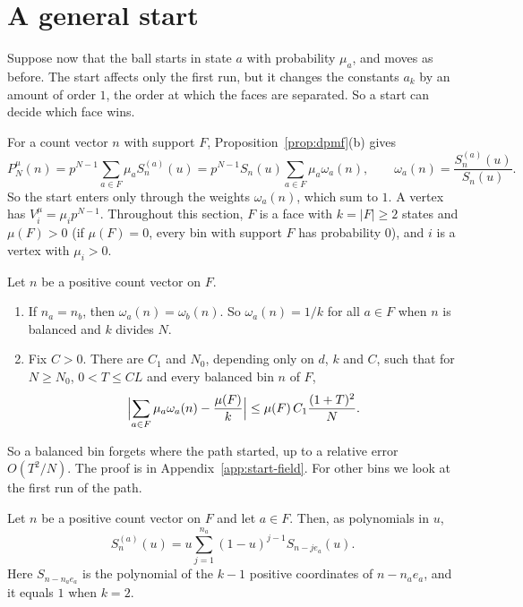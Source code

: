 \section{A general start}\label{sec:general-start}

Suppose now that the ball starts in state $a$ with probability $\mu_a$, and
moves as before. The start affects only the first run, but it changes the
constants $a_k$ by an amount of order $1$, the order at which the faces are
separated. So a start can decide which face wins.

For a count vector $n$ with support $F$, Proposition~\ref{prop:dpmf}(b) gives
\[
 P^\mu_N(n)=p^{N-1}\sum_{a\in F}\mu_aS^{(a)}_n(u)
 =p^{N-1}S_n(u)\sum_{a\in F}\mu_a\omega_a(n),\qquad
 \omega_a(n)=\frac{S^{(a)}_n(u)}{S_n(u)}.
\]
So the start enters only through the weights $\omega_a(n)$, which sum to $1$. A
vertex has $V^\mu_i=\mu_ip^{N-1}$. Throughout this section, $F$ is a face with
$k=|F|\ge2$ states and $\mu(F)>0$ (if $\mu(F)=0$, every bin with support $F$ has
probability $0$), and $i$ is a vertex with $\mu_i>0$.

\begin{lemma}\label{lem:start-weights}
Let $n$ be a positive count vector on $F$.
\begin{enumerate}[(1)]
\item If $n_a=n_b$, then $\omega_a(n)=\omega_b(n)$. So $\omega_a(n)=1/k$ for
all $a\in F$ when $n$ is balanced and $k$ divides $N$.
\item Fix $C>0$. There are $C_1$ and $N_0$, depending only on $d$, $k$ and $C$,
such that for $N\ge N_0$, $0<T\le CL$ and every balanced bin $n$ of $F$,
\[
 \Bigl|\sum_{a\in F}\mu_a\omega_a(n)-\frac{\mu(F)}k\Bigr|
 \le\mu(F)\,C_1\frac{(1+T)^2}N.
\]
\end{enumerate}
\end{lemma}

So a balanced bin forgets where the path started, up to a relative error
$O(T^2/N)$. The proof is in Appendix~\ref{app:start-field}. For other bins we
look at the first run of the path.

\begin{lemma}\label{lem:first-run}
Let $n$ be a positive count vector on $F$ and let $a\in F$. Then, as
polynomials in $u$,
\[
 S^{(a)}_n(u)=u\sum_{j=1}^{n_a}(1-u)^{j-1}S_{n-je_a}(u).
\]
Here $S_{n-n_ae_a}$ is the polynomial of the $k-1$ positive coordinates of
$n-n_ae_a$, and it equals $1$ when $k=2$.
\end{lemma}

